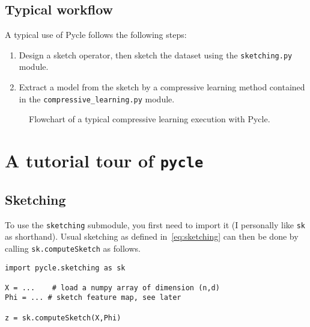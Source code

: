 \documentclass[]{article}
\newcommand{\code}{\texttt}
\renewcommand{\Vec}[1]{\bm{#1}} %
\begin{document}

\subsection{Typical workflow}

A typical use of Pycle follows the following steps:
\begin{enumerate}
	\item Design a sketch operator, then sketch the dataset using the \code{sketching.py} module.
	\item Extract a model from the sketch by a compressive learning method contained in the \code{compressive\_learning.py} module.
\end{enumerate}




	
		
\begin{figure}[!htb]
	\centering
	\caption{Flowchart of a typical compressive learning execution with Pycle.}
	\label{fig:flowchart}
\end {figure}
		



\section{A tutorial tour of \code{pycle}}

\subsection{Sketching} 
To use the \code{sketching} submodule, you first need to import it (I personally like \code{sk} as shorthand). Usual sketching as defined in~\eqref{eq:sketching} can then be done by calling \code{sk.computeSketch} as follows.
\begin{lstlisting}
import pycle.sketching as sk

X = ...    # load a numpy array of dimension (n,d)
Phi = ... # sketch feature map, see later

z = sk.computeSketch(X,Phi)
\end{lstlisting}
\end{document}
